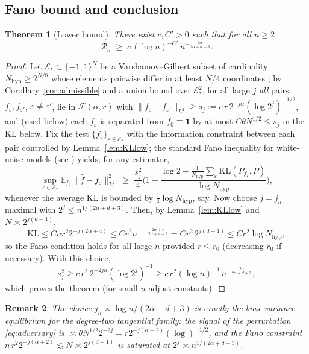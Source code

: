 \documentclass[11pt]{amsart}
\newtheorem{theorem}{Theorem}[section]
\newtheorem{remark}[theorem]{Remark}
\newcommand{\E}{\mathbb{E}}
\newcommand{\1}{\mathbf{1}}
\newcommand{\F}{\mathcal{F}}
\newcommand{\KL}{\mathrm{KL}}
\begin{document}
\subsection{Fano bound and conclusion}

\begin{theorem}[Lower bound]\label{thm:lower}
There exist $c,C'>0$ such that for all $n\ge2$,
\[
\mathcal R_n\;\ge\;c\,(\log n)^{-C'}\,n^{-\frac{2\alpha}{2\alpha+d+3}} .
\]
\end{theorem}

\begin{proof}
Let $\mathcal E_*\subset\{-1,1\}^N$ be a Varshamov--Gilbert subset of
cardinality $N_\mathrm{hyp}\ge2^{N/8}$ whose elements pairwise differ in at
least $N/4$ coordinates \cite[Lemma~2.9]{Tsy09}; by
Corollary~\ref{cor:admissible} and a union bound over
$\mathcal E_*^2$, for all large $j$ \emph{all} pairs
$f_\varepsilon,f_{\varepsilon'}$, $\varepsilon\ne\varepsilon'$, lie in
$\F(\alpha,r)$ with
$\|f_\varepsilon-f_{\varepsilon'}\|_{L^2}\ge
s_j:=c\,r\,2^{-j\alpha}(\log 2^j)^{-1/2}$, and (used below) each
$f_\varepsilon$ is separated from $f_0\equiv\1$ by at most
$C\theta N^{1/2}\le s_j$ in the KL below.
Fix the test $\{f_\varepsilon\}_{\varepsilon\in\mathcal E_*}$ with the
information constraint between each pair controlled by
Lemma~\ref{lem:KLlow}; the standard Fano inequality for white-noise models
(see \cite[Thm.~2.7 and \S2.7.2]{Tsy09}) yields, for any estimator,
\[
\sup_{\varepsilon\in\mathcal E_*}
\E_{f_\varepsilon}\|\hat f-f_\varepsilon\|_{L^2}^2
\;\ge\;\frac{s_j^2}{4}
\Big(1-\frac{\log 2+\frac1{N_\mathrm{hyp}}\sum_\varepsilon
\KL(P_{f_\varepsilon},\bar P)}{\log N_\mathrm{hyp}}\Big),
\]
whenever the average KL is bounded by $\tfrac14\log N_\mathrm{hyp}$, say.
Now choose $j=j_n$ maximal with $2^j\le n^{1/(2\alpha+d+3)}$. Then, by
Lemma~\ref{lem:KLlow} and $N\asymp2^{j(d-1)}$,
\[
\KL\le C n r^2 2^{-j(2\alpha+4)}\le
C r^2 n^{1-\frac{2\alpha+4}{2\alpha+d+3}}=Cr^2\,2^{j(d-1)}
\le Cr^2\log N_\mathrm{hyp},
\]
so the Fano condition holds for all large $n$ provided $r\le r_0$ (decreasing
$r_0$ if necessary). With this choice,
\[
s_j^2\ge c\,r^2\,2^{-2j\alpha}(\log 2^j)^{-1}
\ge c\,r^2(\log n)^{-1}\, n^{-\frac{2\alpha}{2\alpha+d+3}},
\]
which proves the theorem (for small $n$ adjust constants).
\end{proof}

\begin{remark}
The choice $j_n\asymp \log n/(2\alpha+d+3)$ is exactly the
bias--variance equilibrium for the degree-two tangential family:
the signal of the perturbation \eqref{eq:adversary} is
$\asymp \theta N^{1/2}2^{-2j}=r2^{-j(\alpha+2)}(\log)^{-1/2}$, and the Fano
constraint $n\,r^2 2^{-j(\alpha+2)}\lesssim N\asymp2^{j(d-1)}$ is saturated
at $2^j\asymp n^{1/(2\alpha+d+3)}$.
\end{remark}
\end{document}
